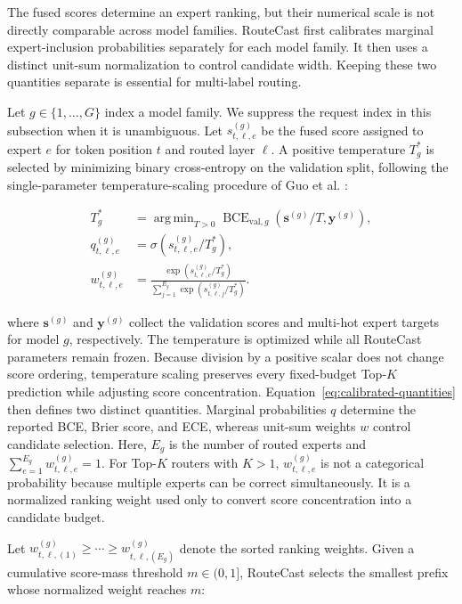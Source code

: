 \documentclass[conference]{IEEEtran}
\DeclareMathOperator*{\argmin}{arg\,min}
\begin{document}
The fused scores determine an expert ranking, but their numerical scale is not
directly comparable across model families. RouteCast first calibrates marginal
expert-inclusion probabilities separately for each model family. It then uses
a distinct unit-sum normalization to control candidate width. Keeping these
two quantities separate is essential for multi-label routing.

Let \(g\in\{1,\ldots,G\}\) index a model family. We suppress the request
index in this subsection when it is unambiguous. Let
\(s_{t,\ell,e}^{(g)}\) be the fused score assigned to expert \(e\) for token
position \(t\) and routed layer \(\ell\). A positive temperature \(T_g^*\) is
selected by minimizing binary cross-entropy on the validation split, following
the single-parameter temperature-scaling procedure of Guo et al.
\cite{guo2017}:

\begin{align}
T_g^*
&=\argmin_{T>0}\operatorname{BCE}_{\mathrm{val},g}
\!\left(\mathbf{s}^{(g)}/T,\mathbf{y}^{(g)}\right), \\
q_{t,\ell,e}^{(g)}
&=\sigma\!\left(s_{t,\ell,e}^{(g)}/T_g^*\right), \\
w_{t,\ell,e}^{(g)}
&=\frac{\exp(s_{t,\ell,e}^{(g)}/T_g^*)}
{\sum_{j=1}^{E_g}\exp(s_{t,\ell,j}^{(g)}/T_g^*)}.
\label{eq:calibrated-quantities}
\end{align}

where \(\mathbf{s}^{(g)}\) and \(\mathbf{y}^{(g)}\) collect the validation
scores and multi-hot expert targets for model \(g\), respectively. The
temperature is optimized while all RouteCast parameters remain frozen.
Because division by a positive scalar does not change score ordering,
temperature scaling preserves every fixed-budget Top-\(K\) prediction while
adjusting score concentration. Equation~\eqref{eq:calibrated-quantities}
then defines two distinct quantities. Marginal probabilities \(q\) determine
the reported BCE, Brier score, and ECE, whereas unit-sum weights \(w\) control
candidate selection. Here, \(E_g\) is the number of routed experts and
\(\sum_{e=1}^{E_g}w_{t,\ell,e}^{(g)}=1\). For Top-\(K\) routers with
\(K>1\), \(w_{t,\ell,e}^{(g)}\) is not a categorical probability because
multiple experts can be correct simultaneously. It is a normalized ranking
weight used only to convert score concentration into a candidate budget.

Let
\(w_{t,\ell,(1)}^{(g)}
\geq\cdots\geq
w_{t,\ell,(E_g)}^{(g)}\)
denote the sorted ranking weights. Given a cumulative score-mass threshold
\(m\in(0,1]\), RouteCast selects the smallest prefix whose normalized weight
reaches \(m\):
\end{document}
